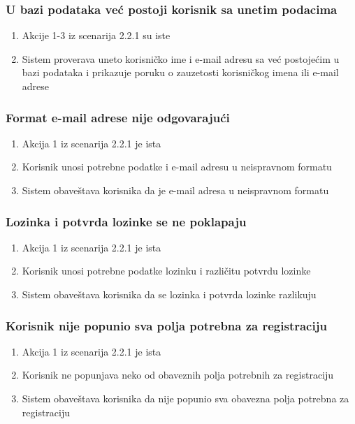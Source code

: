 \documentclass[11pt,a4paper]{article}
\begin{document}
\subsubsection{U bazi podataka već postoji korisnik sa unetim podacima}
\begin{enumerate}
    \item Akcije 1-3 iz scenarija 2.2.1 su iste
    \item Sistem proverava uneto korisničko ime i e-mail adresu sa već postojećim u bazi podataka i prikazuje poruku o zauzetosti korisničkog imena ili e-mail adrese
\end{enumerate}

\subsubsection{Format e-mail adrese nije odgovarajući}
\begin{enumerate}
    \item Akcija 1 iz scenarija 2.2.1 je ista
    \item Korisnik unosi potrebne podatke i e-mail adresu u neispravnom formatu
    \item Sistem obaveštava korisnika da je e-mail adresa u neispravnom formatu
\end{enumerate}

\subsubsection{Lozinka i potvrda lozinke se ne poklapaju}
\begin{enumerate}
    \item Akcija 1 iz scenarija 2.2.1 je ista
    \item Korisnik unosi potrebne podatke lozinku i različitu potvrdu lozinke
    \item Sistem obaveštava korisnika da se lozinka i potvrda lozinke razlikuju
\end{enumerate}

\subsubsection{Korisnik nije popunio sva polja potrebna za registraciju}
\begin{enumerate}
    \item Akcija 1 iz scenarija 2.2.1 je ista
    \item Korisnik ne popunjava neko od obaveznih polja potrebnih za registraciju
    \item Sistem obaveštava korisnika da nije popunio sva obavezna polja potrebna za registraciju
\end{enumerate}
\end{document}
